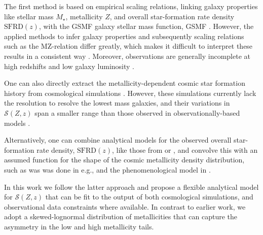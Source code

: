 \documentclass[twocolumn]{aastex631}
\newcommand{\SFRDzZ}{\ensuremath{\mathcal{S}(Z,z)}\xspace}
\newcommand{\SFRDz}{\ensuremath{\mathrm{SFRD}(z)}\xspace}
\begin{document}
The first method is based on empirical scaling relations, linking galaxy properties like stellar mass $M_{\star}$, metallicity $Z$, and overall star-formation rate density \SFRDz, with the GSMF galaxy stellar mass function, GSMF \citep[see e.g.][]{Dominik+2013}. However, the applied methods to infer galaxy properties and subsequently scaling relations such as the MZ-relation differ greatly, which makes it difficult to interpret these results in a consistent way \citep[e.g.,][]{KewleyEllison2008,MaiolinoMannucci2019,Cresci+2019}. Moreover, observations are generally incomplete at high redshifts and low galaxy luminosity \citep[e.g.,][]{Chruslinska+2021}.

One can also directly extract the metallicity-dependent cosmic star formation history from cosmological simulations \citep[e.g.][]{Mapelli2017, Briel+2022_rates}. However, these simulations currently lack the resolution to resolve the lowest mass galaxies, and their variations in \SFRDzZ span a smaller range than those observed in observationally-based models \citep{Pakmor+2022}.

Alternatively, one can combine analytical models for the observed overall star-formation rate density, \SFRDz, like those from \cite{MadauDickinson2014} or \cite{Madau+2017}, and convolve this with an assumed function for the shape of the cosmic metallicity density distribution, such as was was done in e.g., \cite{LangerNorman2006} and the phenomenological model in \cite{Neijssel+2019}.

In this work we follow the latter approach and propose a flexible analytical model for \SFRDzZ that can be fit to the output of both cosmological simulations, and observational data constraints where available. 
In contrast to earlier work, we adopt a skewed-lognormal distribution of metallicities that can capture the asymmetry in the low and high metallicity tails. 
\end{document}
